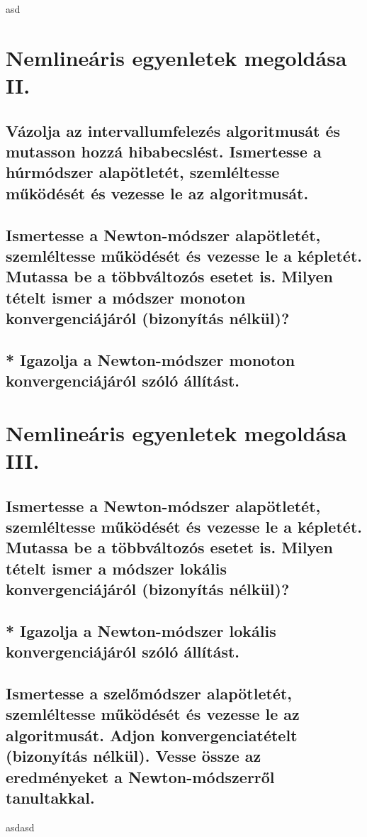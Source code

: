 \documentclass{article}
\begin{document}
asd
    \section{Nemlineáris egyenletek megoldása II.}
        \subsection{Vázolja az intervallumfelezés algoritmusát és mutasson hozzá hibabecslést. Ismertesse a húrmódszer alapötletét, szemléltesse működését és vezesse le az algoritmusát.}
        \subsection{Ismertesse a Newton-módszer alapötletét, szemléltesse működését és vezesse le a képletét. Mutassa be a többváltozós esetet is. Milyen tételt ismer a módszer monoton konvergenciájáról (bizonyítás nélkül)?}
        \subsection{* Igazolja a Newton-módszer monoton konvergenciájáról szóló állítást.}


    \section{Nemlineáris egyenletek megoldása III.}
        \subsection{Ismertesse a Newton-módszer alapötletét, szemléltesse működését és vezesse le a képletét. Mutassa be a többváltozós esetet is. Milyen tételt ismer a módszer lokális konvergenciájáról (bizonyítás nélkül)?}
        \subsection{* Igazolja a Newton-módszer lokális konvergenciájáról szóló állítást.}
        \subsection{Ismertesse a szelőmódszer alapötletét, szemléltesse működését és vezesse le az algoritmusát. Adjon konvergenciatételt (bizonyítás nélkül). Vesse össze az eredményeket a Newton-módszerről tanultakkal.}
    
        asdasd
\end{document}
